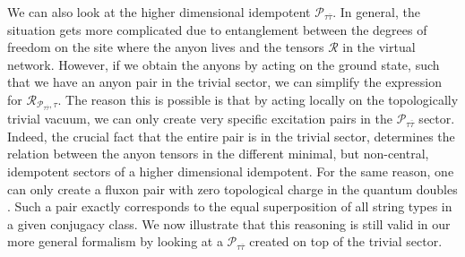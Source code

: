 \documentclass[12 pt]{article}
\begin{document}
We can also look at the higher dimensional idempotent $\mathcal{P}_{\tau\overline{\tau}}$. In general, the situation gets more complicated due to entanglement between the degrees of freedom on the site where the anyon lives and the  tensors $\mathcal{R}$ in the virtual network. However, if we obtain the anyons by acting on the ground state, such that we have an anyon pair in the trivial sector, we can simplify the expression for $\mathcal{R}_{\mathcal{P}_{\tau\overline{\tau}},\tau}$. The reason this is possible is that by acting locally on the topologically trivial vacuum, we can only create very specific excitation pairs in the $\mathcal{P}_{\tau\overline{\tau}}$ sector. Indeed, the crucial fact that the entire pair is in the trivial sector, determines the relation between the anyon tensors in the different minimal, but non-central, idempotent sectors of a higher dimensional idempotent. For the same reason, one can only create a fluxon pair with zero topological charge in the quantum doubles \cite{Ginjectivity,toriccode,preskill1999lecture}. Such a pair exactly corresponds to the equal superposition of all string types in a given conjugacy class. We now illustrate that this reasoning is still valid in our more general formalism by looking at a $\mathcal{P}_{\tau\overline{\tau}}$ created on top of the trivial sector. 



\clearpage



\end{document}
